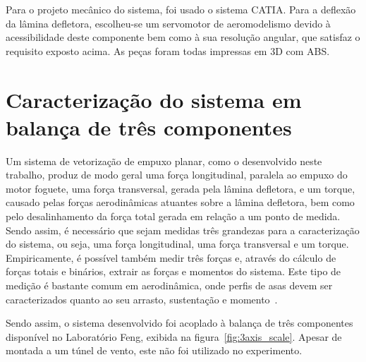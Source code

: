Para o projeto mecânico do sistema, foi usado o sistema CATIA\@. Para a deflexão da lâmina defletora, escolheu-se um servomotor de aeromodelismo devido à acessibilidade deste componente bem como à sua resolução angular, que satisfaz o requisito exposto acima. As peças foram todas impressas em 3D com ABS\@.

\section{Caracterização do sistema em balança de três componentes}\label{sec:method_3axis_measurement}

Um sistema de vetorização de empuxo planar, como o desenvolvido neste trabalho, produz de modo geral uma força longitudinal, paralela ao empuxo do motor foguete, uma força transversal, gerada pela lâmina defletora, e um torque, causado pelas forças aerodinâmicas atuantes sobre a lâmina defletora, bem como pelo desalinhamento da força total gerada em relação a um ponto de medida. Sendo assim, é necessário que sejam medidas três grandezas para a caracterização do sistema, ou seja, uma força longitudinal, uma força transversal e um torque. Empiricamente, é possível também medir três forças e, através do cálculo de forças totais e binários, extrair as forças e momentos do sistema. Este tipo de medição é bastante comum em aerodinâmica, onde perfis de asas devem ser caracterizados quanto ao seu arrasto, sustentação e momento~\cite{anderson}.

Sendo assim, o sistema desenvolvido foi acoplado à balança de três componentes disponível no Laboratório Feng, exibida na figura~\ref{fig:3axis_scale}. Apesar de montada a um túnel de vento, este não foi utilizado no experimento.

